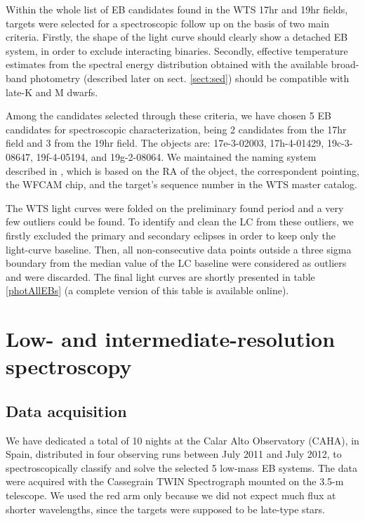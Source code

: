 \documentclass[fleqn,usenatbib]{mnras}
\begin{document}
Within the whole list of EB candidates found in the WTS 17hr and 19hr fields, targets were selected for a spectroscopic follow up on the basis of two main criteria. Firstly, the shape of the light curve should clearly show a detached EB system, in order to exclude interacting binaries. Secondly, effective temperature estimates from the spectral energy distribution obtained with the available broad-band photometry (described later on sect. \ref{sect:sed}) should be compatible with late-K and M dwarfs.

Among the candidates selected through these criteria, we have chosen 5 EB candidates for spectroscopic characterization, being 2 candidates from the 17hr field and 3 from the 19hr field. The objects are: 17e-3-02003, 17h-4-01429, 19c-3-08647, 19f-4-05194, and 19g-2-08064. 
We maintained the naming system described in \citet{Birkby12}, which is based on the RA of the object, the correspondent pointing, the WFCAM chip, and the target's sequence number in the WTS master catalog.

The WTS light curves were folded on the preliminary found period and a very few outliers could be found. To identify and clean the LC from these outliers, we firstly excluded the primary and secondary eclipses in order to keep only the light-curve baseline. Then, all non-consecutive data points outside a three sigma boundary from the median value of the LC baseline were considered as outliers and were discarded. %
The final light curves are shortly presented in table \ref{photAllEBs} (a complete version of this table is available online).


\section{Low- and intermediate-resolution spectroscopy}
\label{sec:specobs}

\subsection{Data acquisition}

We have dedicated a total of 10 nights at the Calar Alto Observatory (CAHA), in Spain, distributed in four observing runs between July 2011 and July 2012, to spectroscopically classify and solve the selected 5 low-mass EB systems. The data were acquired with the Cassegrain TWIN Spectrograph mounted on the 3.5-m telescope. We used the red arm only because 
we did not expect much flux at shorter wavelengths, since the targets were supposed to be late-type stars.
\end{document}
